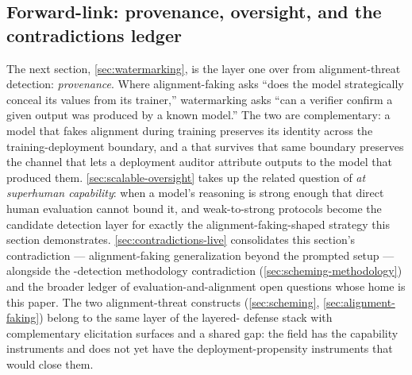 \subsection{Forward-link: provenance, oversight, and the contradictions ledger}
\label{sec:alignment-faking-forward}

The next section, \cref{sec:watermarking}, is the layer one over from
alignment-threat detection: \emph{provenance}. Where alignment-faking
asks ``does the model strategically conceal its values from its
trainer,'' watermarking asks ``can a verifier confirm a given output
was produced by a known model.'' The two are complementary: a
model that fakes alignment during training preserves its identity
across the training-deployment boundary, and a  that survives
that same boundary preserves the channel that lets a deployment auditor
attribute outputs to the model that produced them. \cref{sec:scalable-oversight}
takes up the related question of \emph{ at
superhuman capability}: when a model's reasoning is strong enough
that direct human evaluation cannot bound it,  and
weak-to-strong protocols become the candidate detection layer for
exactly the alignment-faking-shaped strategy this section
demonstrates. \cref{sec:contradictions-live} consolidates this
section's contradiction --- alignment-faking generalization beyond
the prompted setup --- alongside the -detection methodology
contradiction (\cref{sec:scheming-methodology}) and the broader
ledger of evaluation-and-alignment open questions whose home is this
paper. The two alignment-threat constructs (\cref{sec:scheming},
\cref{sec:alignment-faking}) belong to the same layer of the layered-
defense stack with complementary elicitation surfaces and a shared
gap: the field has the capability instruments and does not yet have
the deployment-propensity instruments that would close them.
